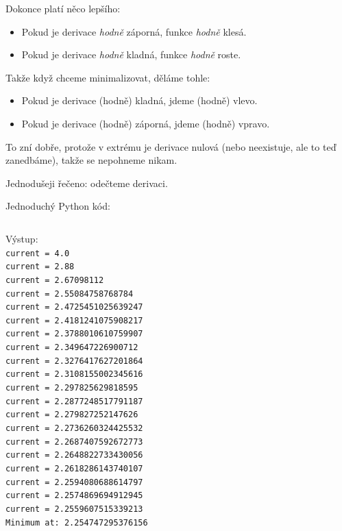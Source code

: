 Dokonce platí něco lepšího:
\begin{itemize}
	\item  Pokud je derivace \emph{hodně} záporná, funkce \emph{hodně} klesá.
	\item  Pokud je derivace \emph{hodně} kladná, funkce \emph{hodně} roste.
\end{itemize}

Takže když chceme minimalizovat, děláme tohle:
\begin{itemize}
	\item  Pokud je derivace (hodně) kladná, jdeme (hodně) vlevo.
	\item  Pokud je derivace (hodně) záporná, jdeme (hodně) vpravo.
\end{itemize}

To zní dobře, protože v extrému je derivace nulová (nebo neexistuje, ale to teď zanedbáme), takže se nepohneme nikam.

Jednodušeji řečeno: odečteme derivaci.

Jednoduchý Python kód:
\inputminted{python}{bonus/gd.py}
Výstup:
\texttt{\\
current = 4.0\\
current = 2.88\\
current = 2.67098112\\
current = 2.55084758768784\\
current = 2.4725451025639247\\
current = 2.4181241075908217\\
current = 2.3788010610759907\\
current = 2.349647226900712\\
current = 2.3276417627201864\\
current = 2.3108155002345616\\
current = 2.297825629818595\\
current = 2.2877248517791187\\
current = 2.279827252147626\\
current = 2.2736260324425532\\
current = 2.2687407592672773\\
current = 2.2648822733430056\\
current = 2.2618286143740107\\
current = 2.2594080688614797\\
current = 2.2574869694912945\\
current = 2.2559607515339213\\
Minimum at: 2.254747295376156
}

